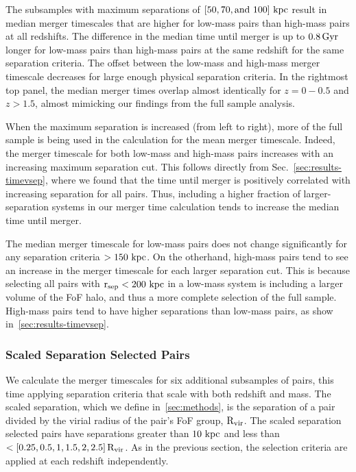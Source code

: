 \documentclass[twocolumn,linenumbers]{aastex631}
\newcommand{\Rvir}{\ensuremath{\rm R_{vir}}}
\newcommand{\rsep}{\ensuremath{\rm r_{sep}}}
\begin{document}
    The subsamples with maximum separations of $[50, 70, \mbox{and } 100]\,\mathrm{\,kpc}$ result in median merger timescales that are higher for low-mass pairs than high-mass pairs at all redshifts. 
    The difference in the median time until merger is up to $0.8\,\mathrm{Gyr}$ longer for low-mass pairs than high-mass pairs at the same redshift for the same separation criteria. 
    The offset between the low-mass and high-mass merger timescale decreases for large enough physical separation criteria. 
    In the rightmost top panel, the median merger times overlap almost identically for $z=0-0.5$ and $z>1.5$, almost mimicking our findings from the full sample analysis. 
    
    When the maximum separation is increased (from left to right), more of the full sample is being used in the calculation for the mean merger timescale. 
    Indeed, the merger timescale for both low-mass and high-mass pairs increases with an increasing maximum separation cut.  
    This follows directly from Sec.~\ref{sec:results-timevsep}, where we found that the time until merger is positively correlated with increasing separation for all pairs. 
    Thus, including a higher fraction of larger-separation systems in our merger time calculation tends to increase the median time until merger. 
    
    The median merger timescale for low-mass pairs does not change significantly for any separation criteria $>150\,\mathrm{\,kpc}$. 
    On the otherhand, high-mass pairs tend to see an increase in the merger timescale for each larger separation cut. 
    This is because selecting all pairs with $\rsep<200\,\kpc$ in a low-mass system is including a larger volume of the FoF halo, and thus a more complete selection of the full sample.
    High-mass pairs tend to have higher separations than low-mass pairs, as show in~\ref{sec:results-timevsep}. 

\subsubsection{Scaled Separation Selected Pairs}
\label{sec:results-scal}
    We calculate the merger timescales for six additional subsamples of pairs, this time applying separation criteria that scale with both redshift and mass.
    The scaled separation, which we define in~\ref{sec:methods},  is the separation of a pair divided by the virial radius of the pair's FoF group, $\Rvir$. 
    The scaled separation selected pairs have separations greater than $10\,\mathrm{\,kpc}$ and less than $<[0.25, 0.5, 1, 1.5, 2, 2.5]\,\Rvir$. 
    As in the previous section, the selection criteria are applied at each redshift independently. 
    
\end{document}
